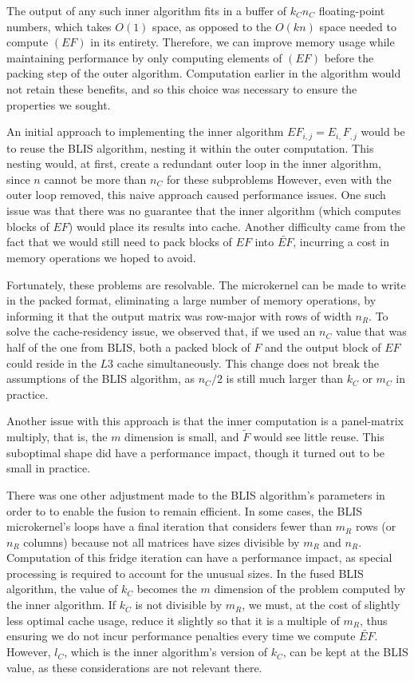 \documentclass[12pt]{article}
\begin{document}
The output of any such inner algorithm fits in a buffer of $k_Cn_C$ floating-point numbers, which takes $O(1)$ space, as opposed to the $O(kn)$ space needed to compute $(EF)$ in its entirety.
Therefore, we can improve memory usage while maintaining performance by only computing elements of $(EF)$ before the packing step of the outer algorithm.
Computation earlier in the algorithm would not retain these benefits, and so this choice was necessary to ensure the properties we sought.

An initial approach to implementing the inner algorithm $EF_{i, j} = E_{i,}F_{,j}$ would be to reuse the BLIS algorithm, nesting it within the outer computation.
This nesting would, at first, create a redundant outer loop in the inner algorithm, since $n$ cannot be more than $n_C$ for these subproblems
However, even with the outer loop removed, this naive approach caused performance issues.
One such issue was that there was no guarantee that the inner algorithm (which computes blocks of $EF$) would place its results into cache.
Another difficulty came from the fact that we would still need to pack blocks of $EF$ into $\widetilde{EF}$, incurring a cost in memory operations we hoped to avoid.

Fortunately, these problems are resolvable.
The microkernel can be made to write in the packed format, eliminating a large number of memory operations, by informing it that the output matrix was row-major with rows of width $n_R$.
To solve the cache-residency issue, we observed that, if we used an $n_C$ value that was half of the one from BLIS, both a packed block of $F$ and the output block of $EF$ could reside in the $L3$ cache simultaneously.
This change does not break the assumptions of the BLIS algorithm, as $n_C/2$ is still much larger than $k_C$ or $m_C$ in practice.

Another issue with this approach is that the inner computation is a panel-matrix multiply, that is, the $m$ dimension is small, and $\widetilde{F}$ would see little reuse.
This suboptimal shape did have a performance impact, though it turned out to be small in practice.

There was one other adjustment made to the BLIS algorithm's parameters in order to to enable the fusion to remain efficient.
In some cases, the BLIS microkernel's loops have a final iteration that considers fewer than $m_R$ rows (or $n_R$ columns) because not all matrices have sizes divisible by $m_R$ and $n_R$.
Computation of this fridge iteration can have a performance impact, as special processing is required to account for the unusual sizes.
In the fused BLIS algorithm, the value of $k_C$ becomes the $m$ dimension of the problem computed by the inner algorithm.
If $k_C$ is not divisible by $m_R$, we must, at the cost of slightly less optimal cache usage, reduce it slightly so that it is a multiple of $m_R$, thus ensuring we do not incur performance penalties every time we compute $\widetilde{EF}$.
However, $l_C$, which is the inner algorithm's version of $k_C$, can be kept at the BLIS value, as these considerations are not relevant there.
\end{document}

